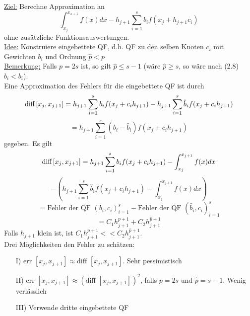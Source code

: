\begin{nothing}
\underline{Ziel:} Berechne Approximation an 
$$\int_{x_j}^{x_{x+1}} f(x)dx - h_{j+1} \sum_{i=1}^s b_i f(x_j + h_{j+1} c_i)$$
ohne zusätzliche Funktionsauswertungen.\\
\underline{Idee:} Konstruiere eingebettete QF, d.h. QF zu den selben Knoten $c_i$ mit Gewichten $b_i$ und Ordnung $\hat{p} < p$ \\
\underline{Bemerkung:} Falls $p=2s$ ist, so gilt $\hat{p} \leq s-1$ (wäre $\hat{p} \geq s$, so wäre nach (2.8) $\hat{b}_i < b_i$).\\
Eine Approximation des Fehlers für die eingebettete QF ist durch 
$$\text{diff} \thinspace [x_j, x_{j+1}] = h_{j+1} \sum_{i=1}^s b_i f(x_j + c_i h_{j+1}) - h_{j+1} \sum_{i=1}^s \hat{b}_i f(x_j + c_i h_{j+1})$$
$$ = h_{j+1} \sum_{i=1}^s (b_i - \hat{b}_i) f(x_j+c_i h_{j+1})$$
gegeben. Es gilt
$$\text{diff} \thinspace [x_j, x_{j+1}] = h_{j+1} \sum_{i=1}^s b_i f(x_j + c_i h_{j+1}) - \int_{x_j}^{x_{j+1}} f(x)dx$$ 
$$- \left( h_{j+1} \sum_{i=1}^s \hat{b}_i f(x_j + c_i h_{j+1}) - \int_{x_j}^{x_{j+1}} f(x)dx \right)$$
$$ = \text{Fehler der QF } (b_i, c_i)_{i=1}^s - \text{Fehler der QF } (\hat{b}_i, c_i)_{i=1}^s$$
$$ = C_1 h_{j+1}^{p+1} + C_2h_{j+1}^{\hat{p}+1}$$
Falls $h_{j+1}$ klein ist, ist $C_1 h_{j+1}^{p+1} << C_2h_{j+1}^{\hat{p}+1}$.\\
Drei Möglichkeiten den Fehler zu schätzen:
\begin{enumerate}
  \item[I)] $\text{err }[x_j, x_{j+1}] \approx \text{diff }[x_j, x_{j+1}]$. Sehr pessimistisch
  \item[II)] $\text{err }[x_j, x_{j+1}] \approx (\text{diff }[x_j, x_{j+1}])^2$, falls $p=2s$ und $\hat{p} = s-1$. Wenig verlässlich
  \item[III)] Verwende dritte eingebettete QF 
\end{enumerate}
\end{nothing}